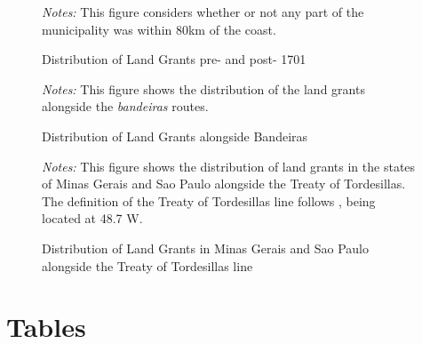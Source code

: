 \documentclass{article}
\begin{document}
\begin{figure}
  \caption{Distribution of Land Grants pre- and post- 1701}
  \begin{center}
  \textit{Notes:} This figure considers whether or not any part of the municipality was within 80km of the coast.
  \end{center}
  \label{fig:SesmariasDistribution}
\end{figure}

\begin{figure}
  \caption{Distribution of Land Grants alongside Bandeiras}
  \begin{center}
  \textit{Notes:} This figure shows the distribution of the land grants alongside the \textit{bandeiras} routes.
  \end{center}
  \label{fig:Bandeiras}
\end{figure}

\begin{landscape}
\begin{figure}
  \caption{Distribution of Land Grants in Minas Gerais and Sao Paulo alongside the Treaty of Tordesillas line}
  \begin{center}
  \end{center}
  \textit{Notes:} This figure shows the distribution of land grants in the states of Minas Gerais and Sao Paulo alongside the Treaty of Tordesillas. The definition of the Treaty of Tordesillas line follows \textcite{Laudares2022-vy}, being located at 48.7 W.
  \label{fig:Tordesillas}
\end{figure}
\end{landscape}

\clearpage

\section*{Tables}
\end{document}
